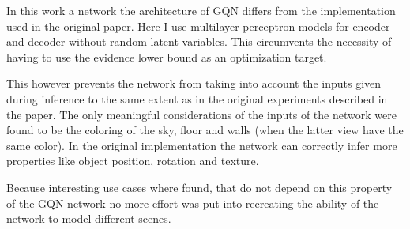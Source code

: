 In this work a network the architecture of GQN differs from the implementation used in the original paper. Here I use multilayer perceptron models for encoder and decoder without random latent variables. This circumvents the necessity of having to use the evidence lower bound as an optimization target.

This however prevents the network from taking into account the inputs given during inference to the same extent as in the original experiments described in the paper. The only meaningful considerations of the inputs of the network were found to be the coloring of the sky, floor and walls (when the latter view have the same color). In the original implementation the network can correctly infer more properties like object position, rotation and texture.

Because interesting use cases where found, that do not depend on this property of the GQN network no more effort was put into recreating the ability of the network to model different scenes.
